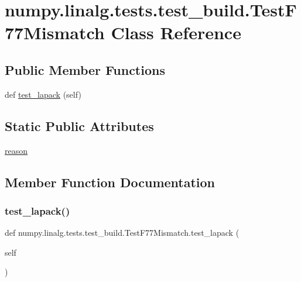 \hypertarget{classnumpy_1_1linalg_1_1tests_1_1test__build_1_1TestF77Mismatch}{}\section{numpy.\+linalg.\+tests.\+test\+\_\+build.\+Test\+F77\+Mismatch Class Reference}
\label{classnumpy_1_1linalg_1_1tests_1_1test__build_1_1TestF77Mismatch}
\subsection*{Public Member Functions}
\begin{DoxyCompactItemize}
\item 
def \hyperlink{classnumpy_1_1linalg_1_1tests_1_1test__build_1_1TestF77Mismatch_aebea70ba745dcd0d7ad4a22c49082318}{test\+\_\+lapack} (self)
\end{DoxyCompactItemize}
\subsection*{Static Public Attributes}
\begin{DoxyCompactItemize}
\item 
\hyperlink{classnumpy_1_1linalg_1_1tests_1_1test__build_1_1TestF77Mismatch_ad9c53c195a4f96fad921aa20b072ebfc}{reason}
\end{DoxyCompactItemize}


\subsection{Member Function Documentation}
\mbox{\label{classnumpy_1_1linalg_1_1tests_1_1test__build_1_1TestF77Mismatch_aebea70ba745dcd0d7ad4a22c49082318}} 
\subsubsection{\texorpdfstring{test\+\_\+lapack()}{test\_lapack()}}
{\footnotesize\ttfamily def numpy.\+linalg.\+tests.\+test\+\_\+build.\+Test\+F77\+Mismatch.\+test\+\_\+lapack (\begin{DoxyParamCaption}\item[{}]{self }\end{DoxyParamCaption})}



